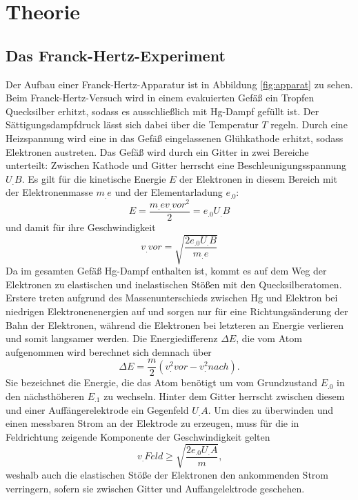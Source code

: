 
\section{Theorie}
\label{sec:Theorie}

\subsection{Das Franck-Hertz-Experiment}
Der Aufbau einer Franck-Hertz-Apparatur ist in Abbildung \ref{fig:apparat} zu sehen.
Beim Franck-Hertz-Versuch wird in einem evakuierten Gefäß ein Tropfen Quecksilber erhitzt, sodass es ausschließlich mit Hg-Dampf gefüllt ist. Der Sättigungsdampfdruck lässt sich dabei über die Temperatur $T$ regeln.
Durch eine Heizspannung wird eine in das Gefäß eingelassenen Glühkathode erhitzt, sodass Elektronen austreten. 
Das Gefäß wird durch ein Gitter in zwei Bereiche unterteilt:
Zwischen Kathode und Gitter herrscht eine Beschleunigungsspannung $U_.B$.
Es gilt für die kinetische Energie $E$ der Elektronen in diesem Bereich mit der Elektronenmasse $m_.e$ und der Elementarladung $e_.0$:
\begin{equation*}
E=\frac{m_.ev_.{vor^2}}{2}=e_.0U_.B
\end{equation*}
und damit für ihre Geschwindigkeit
\begin{equation*}
v_.{vor}=\sqrt{\frac{2e_.0U_.B}{m_.e}}
\end{equation*}
Da im gesamten Gefäß Hg-Dampf enthalten ist, kommt es auf dem Weg der Elektronen zu elastischen und inelastischen Stößen mit den Quecksilberatomen. Erstere treten aufgrund des Massenunterschieds zwischen Hg und Elektron bei niedrigen Elektronenenergien auf und sorgen nur für eine Richtungsänderung der Bahn der Elektronen, während die Elektronen bei letzteren an Energie verlieren und somit langsamer werden.
Die Energiedifferenz $\Delta E$, die vom Atom aufgenommen wird berechnet sich demnach über
\[
\Delta E = \frac{m}{2}\left(v^2_.{vor}-v^2_.{nach}\right)\text{.}\label{eq:DeltaE}
\]
Sie bezeichnet die Energie, die das Atom benötigt um vom Grundzustand $E_.0$ in den nächsthöheren $E_.1$ zu wechseln.
Hinter dem Gitter herrscht zwischen diesem und einer Auffängerelektrode ein Gegenfeld $U_.A$.
Um dies zu überwinden und einen messbaren Strom an der Elektrode zu erzeugen, muss für die in Feldrichtung zeigende Komponente der Geschwindigkeit gelten
\[
v_.{Feld}\geq \sqrt{\frac{2e_.0U_.A}{m}}\text{,}
\]
weshalb auch die elastischen Stöße der Elektronen den ankommenden Strom verringern, sofern sie zwischen Gitter und Auffangelektrode geschehen.
